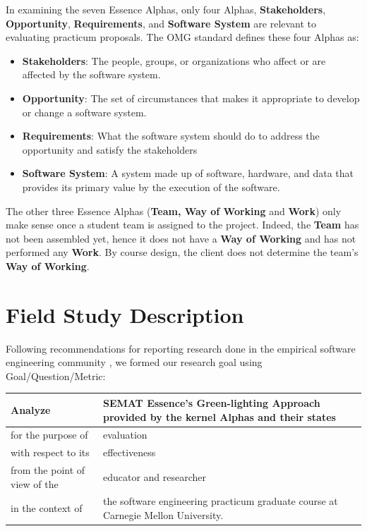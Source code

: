 In examining the seven Essence Alphas, only four Alphas,
\textbf{Stakeholders}, \textbf{Opportunity}, \textbf{Requirements}, and \textbf{Software System} are relevant to evaluating practicum proposals. The OMG standard defines these four Alphas as: \cite{OMGStandard}

\begin{itemize}
\itemsep1pt\parskip0pt
\item
  \textbf{Stakeholders}: The people, groups, or organizations who affect or
  are affected by the software system.
\item
  \textbf{Opportunity}: The set of circumstances that makes it appropriate to
  develop or change a software system.
\item
  \textbf{Requirements}: What the software system should do to address the
  opportunity and satisfy the stakeholders
\item
  \textbf{Software System}: A system made up of software, hardware, and data
  that provides its primary value by the execution of the software.
\end{itemize}

The other three Essence Alphas (\textbf{Team, Way of Working} and \textbf{Work}) only make sense once a student team is
assigned to the project. Indeed, the \textbf{Team} has not been assembled yet,
hence it does not have a \textbf{Way of Working} and has not performed any
\textbf{Work}. By course design, the client does not determine the team's
\textbf{Way of Working}.


\section{Field Study Description}
\label{Field Study Description}

Following recommendations for reporting research done in the empirical
software engineering community
\cite{GQM, Shaw}, we formed our
research goal using Goal/Question/Metric:
\cite{GQM}

\begin{table}[h]
\renewcommand{\arraystretch}{1.3}
\centering
\begin{tabular}{|p{1.00in}|p{2.10in}|}
\hline
Analyze & SEMAT Essence’s Green-lighting Approach provided by the kernel Alphas and their states \\ \hline
for the purpose of & evaluation \\ \hline
with respect to its & effectiveness \\ \hline
from the point of view of the & educator and researcher \\ \hline
in the context of  & the software engineering practicum graduate course at Carnegie Mellon University. \\
\hline
\end{tabular}
\end{table}


